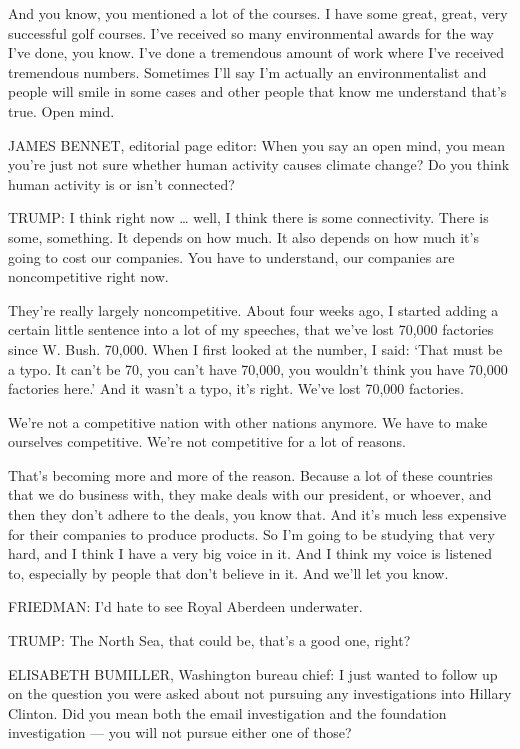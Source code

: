 And you know, you mentioned a lot of the courses. I have some great,
great, very successful golf courses. I've received so many environmental
awards for the way I've done, you know. I've done a tremendous amount of
work where I've received tremendous numbers. Sometimes I'll say I'm
actually an environmentalist and people will smile in some cases and
other people that know me understand that's true. Open mind.

JAMES BENNET, editorial page editor: When you say an open mind, you mean
you're just not sure whether human activity causes climate change? Do
you think human activity is or isn't connected?

TRUMP: I think right now \ldots{} well, I think there is some
connectivity. There is some, something. It depends on how much. It also
depends on how much it's going to cost our companies. You have to
understand, our companies are noncompetitive right now.

They're really largely noncompetitive. About four weeks ago, I started
adding a certain little sentence into a lot of my speeches, that we've
lost 70,000 factories since W. Bush. 70,000. When I first looked at the
number, I said: `That must be a typo. It can't be 70, you can't have
70,000, you wouldn't think you have 70,000 factories here.' And it
wasn't a typo, it's right. We've lost 70,000 factories.

We're not a competitive nation with other nations anymore. We have to
make ourselves competitive. We're not competitive for a lot of reasons.

That's becoming more and more of the reason. Because a lot of these
countries that we do business with, they make deals with our president,
or whoever, and then they don't adhere to the deals, you know that. And
it's much less expensive for their companies to produce products. So I'm
going to be studying that very hard, and I think I have a very big voice
in it. And I think my voice is listened to, especially by people that
don't believe in it. And we'll let you know.

FRIEDMAN: I'd hate to see Royal Aberdeen underwater.

TRUMP: The North Sea, that could be, that's a good one, right?

ELISABETH BUMILLER, Washington bureau chief: I just wanted to follow up
on the question you were asked about not pursuing any investigations
into Hillary Clinton. Did you mean both the email investigation and the
foundation investigation --- you will not pursue either one of those?

